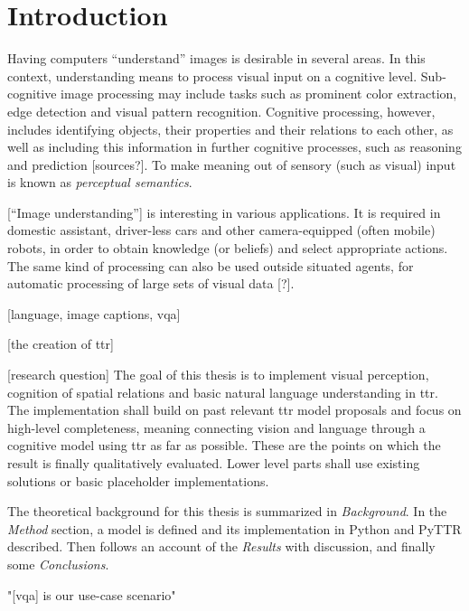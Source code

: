 \glsresetall
\section{Introduction}
\label{sec:intro}

Having computers ``understand'' images is desirable in several areas.
In this context, understanding means to process visual input on a cognitive level.
Sub-cognitive image processing may include tasks such as prominent color extraction, edge detection and visual pattern recognition.
Cognitive processing, however, includes identifying objects, their properties and their relations to each other, as well as including this information in further cognitive processes, such as reasoning and prediction [sources?].
To make meaning out of sensory (such as visual) input is known as \textit{perceptual semantics}.

[``Image understanding''] is interesting in various applications.
It is required in domestic assistant, driver-less cars and other camera-equipped (often mobile) robots, in order to obtain knowledge (or beliefs) and select appropriate actions.
The same kind of processing can also be used outside situated agents, for automatic processing of large sets of visual data [?].

[language, image captions, vqa]

[the creation of ttr]

[research question]
The goal of this thesis is to implement visual perception, cognition of spatial relations and basic natural language understanding in \gls{ttr}.
The implementation shall build on past relevant \gls{ttr} model proposals and focus on high-level completeness, meaning connecting vision and language through a cognitive model using \gls{ttr} as far as possible.
These are the points on which the result is finally qualitatively evaluated.
Lower level parts shall use existing solutions or basic placeholder implementations.

The theoretical background for this thesis is summarized in \textit{Background}.
In the \textit{Method} section, a model is defined and its implementation in Python and PyTTR described.
Then follows an account of the \textit{Results} with discussion, and finally some \textit{Conclusions}.

"[vqa] is our use-case scenario"